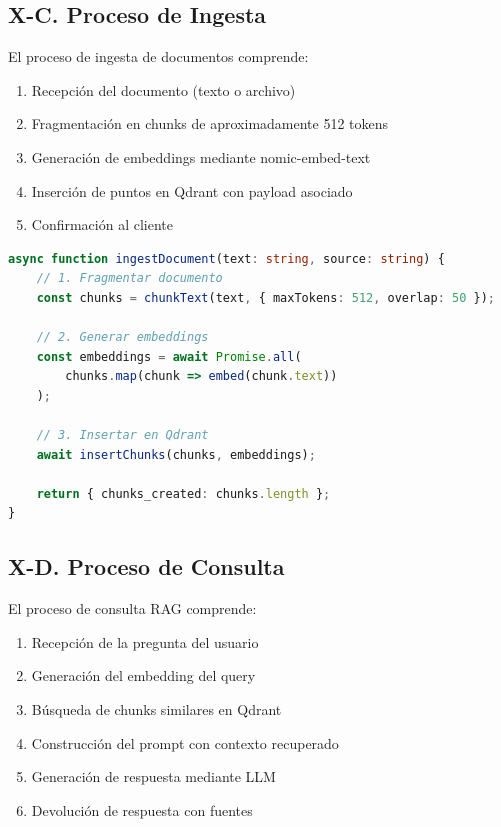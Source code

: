 \documentclass[conference]{IEEEtran}
\begin{document}
\subsection{X-C. Proceso de Ingesta}

El proceso de ingesta de documentos comprende:

\begin{enumerate}
    \item Recepción del documento (texto o archivo)
    \item Fragmentación en chunks de aproximadamente 512 tokens
    \item Generación de embeddings mediante nomic-embed-text
    \item Inserción de puntos en Qdrant con payload asociado
    \item Confirmación al cliente
\end{enumerate}

\begin{lstlisting}[language=typescript, caption={Proceso de ingesta}]
async function ingestDocument(text: string, source: string) {
    // 1. Fragmentar documento
    const chunks = chunkText(text, { maxTokens: 512, overlap: 50 });
    
    // 2. Generar embeddings
    const embeddings = await Promise.all(
        chunks.map(chunk => embed(chunk.text))
    );
    
    // 3. Insertar en Qdrant
    await insertChunks(chunks, embeddings);
    
    return { chunks_created: chunks.length };
}
\end{lstlisting}

\subsection{X-D. Proceso de Consulta}

El proceso de consulta RAG comprende:

\begin{enumerate}
    \item Recepción de la pregunta del usuario
    \item Generación del embedding del query
    \item Búsqueda de chunks similares en Qdrant
    \item Construcción del prompt con contexto recuperado
    \item Generación de respuesta mediante LLM
    \item Devolución de respuesta con fuentes
\end{enumerate}
\end{document}

